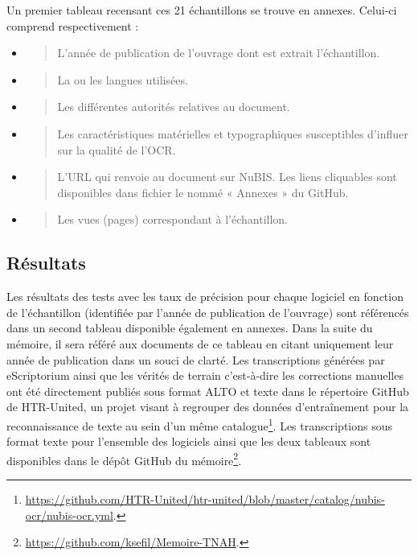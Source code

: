 \documentclass[a4paper,12pt,twoside]{book}
\begin{document}
	Un premier tableau recensant  ces 21 échantillons se trouve en
	annexes. Celui-ci comprend respectivement : \\
	
	\begin{itemize}
		\item
		\begin{quote}
			L'année de publication de l'ouvrage dont est extrait l'échantillon.
		\end{quote}
		\item
		\begin{quote}
			La ou les langues utilisées.
		\end{quote}
		\item
		\begin{quote}
			Les différentes autorités relatives au document.
		\end{quote}
		\item
		\begin{quote}
			Les caractéristiques matérielles et typographiques susceptibles
			d'influer sur la qualité de l'OCR.
		\end{quote}
		\item
		\begin{quote}
			L'URL qui renvoie au document sur NuBIS. Les liens cliquables sont disponibles dans fichier le nommé « Annexes » du GitHub.
		\end{quote}
		\item
		\begin{quote}
			Les vues (pages) correspondant à l'échantillon. \\
		\end{quote}
	\end{itemize}
	
	
	\subsection{Résultats}
	
	Les résultats des tests avec les taux de précision pour chaque logiciel
	en fonction de l'échantillon (identifiée par l'année de publication de
	l'ouvrage) sont référencés dans un second tableau disponible également
	en annexes. Dans la suite du mémoire, il sera référé aux documents de ce
	tableau en citant uniquement leur année de publication dans un souci de
	clarté. Les transcriptions générées par eScriptorium ainsi que les
	vérités de terrain c'est-à-dire les corrections manuelles ont été directement publiés sous format ALTO et texte
	dans le répertoire GitHub de HTR-United, un projet visant à regrouper
	des données d'entraînement pour la reconnaissance de
	texte au sein d'un même catalogue\footnote{\url{https://github.com/HTR-United/htr-united/blob/master/catalog/nubis-ocr/nubis-ocr.yml}.}.
	Les transcriptions sous format texte pour l'ensemble des logiciels ainsi
	que les deux tableaux sont disponibles dans le dépôt GitHub du
	mémoire\footnote{\url{https://github.com/ksefil/Memoire-TNAH}.}. \\
	
\end{document}
